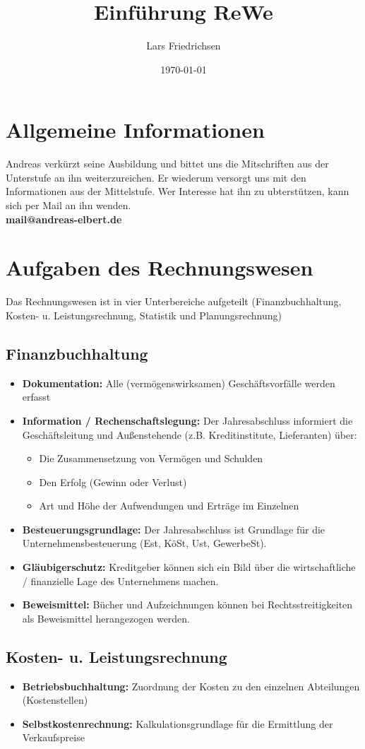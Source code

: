 \documentclass[a4paper,11pt]{scrartcl}	%
\title{Einführung ReWe}
\author{Lars Friedrichsen}
\date{\today}
\begin{document}
\section{Allgemeine Informationen}
Andreas verkürzt seine Ausbildung und bittet uns die Mitschriften aus der Unterstufe an ihn weiterzureichen.
Er wiederum versorgt uns mit den Informationen aus der Mittelstufe. Wer Interesse hat ihn zu ubterstützen, kann sich
per Mail an ihn wenden.\\[0.5cm] 
\textbf{mail@andreas-elbert.de}


\section{Aufgaben des Rechnungswesen}
Das Rechnungswesen ist in vier Unterbereiche aufgeteilt (Finanzbuchhaltung, Kosten- u. Leistungsrechnung, Statistik und Planungsrechnung)

	\subsection{Finanzbuchhaltung}
			\begin{itemize}
			\item \textbf{Dokumentation:} Alle (vermögenswirksamen) Geschäftsvorfälle werden erfasst
			\item \textbf{Information / Rechenschaftslegung:} Der Jahresabschluss informiert die Geschäftsleitung und
			Außenstehende (z.B. Kreditinstitute, Lieferanten) über:
				\begin{itemize}
					\item Die Zusammensetzung von Vermögen und Schulden
					\item Den  Erfolg (Gewinn oder Verlust)
					\item Art und Höhe der Aufwendungen und Erträge im Einzelnen
				\end{itemize}
			\item \textbf{Besteuerungsgrundlage:} Der Jahresabschluss ist Grundlage für die Unternehmensbesteuerung 
			(Est, KöSt, Ust, GewerbeSt).
			\item \textbf{Gläubigerschutz:} Kreditgeber können sich ein Bild über die wirtschaftliche / finanzielle
			Lage des Unternehmens machen.
			\item \textbf{Beweismittel:} Bücher und Aufzeichnungen können bei Rechtsstreitigkeiten als Beweismittel
			herangezogen werden. 
		\end{itemize}			 

	\subsection{Kosten- u. Leistungsrechnung}
		\begin{itemize}
			\item \textbf{Betriebsbuchhaltung:} Zuordnung der Kosten zu den einzelnen Abteilungen (Kostenstellen)
			\item \textbf{Selbstkostenrechnung:} Kalkulationsgrundlage für die Ermittlung der Verkaufspreise 
		\end{itemize}
		
\end{document}
